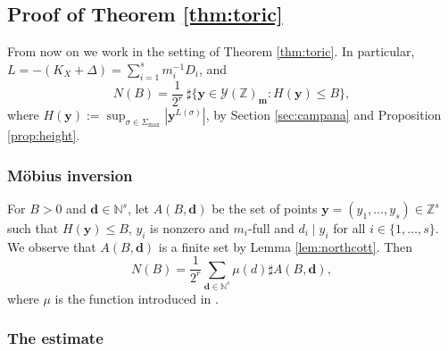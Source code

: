 \documentclass[11pt]{article}
\numberwithin{equation}{section}
\newcommand{\bfy}{\boldsymbol{y}}
\newcommand{\bfm}{{\boldsymbol{m}}}
\newcommand{\bfd}{\boldsymbol{d}}
\newcommand\ZZ{\mathbb{Z}}
\newcommand\NN{\mathbb{N}}
\theoremstyle{definition}
\numberwithin{theorem}{section}
\begin{document}
\subsection{Proof of Theorem \ref{thm:toric}}
\label{sec:proof_thmtoric}

From now on we work in the setting of Theorem \ref{thm:toric}.
In particular, $L=-(K_X+\Delta)=\sum_{i=1}^s m_i^{-1}D_i$, and
\[
N(B)=\frac 1{2^r}\ \sharp
\{\bfy\in\mathscr{Y}(\ZZ)_{\bfm}: H(\bfy)\leq B\},
\]
where
$H(\bfy):=\sup_{\sigma\in\Sigma_{\max}} | \bfy^{L(\sigma)}|$,
by Section \ref{sec:campana} and Proposition \ref{prop:height}.

\subsubsection{Möbius inversion}

For $B>0$ and $\bfd\in\NN^{s}$,
let $A(B,\bfd)$ be the set of points
$\bfy=(y_1,\dots,y_s)\in\ZZ^{s}$ such that
$H(\bfy)\leq B$, $y_i$ is nonzero and $m_i$-full and $d_i\mid y_i$ for all $i\in\{1,\dots,s\}$.
We observe that $A(B, \bfd)$ is a finite set by Lemma \ref{lem:northcott}.
Then
\begin{equation}
\label{eq:moebius_inversion}
N(B)=\frac 1{2^r}\sum_{\bfd\in\NN^{s}}\mu(d)\sharp A(B, \bfd),
\end{equation}
where $\mu$ is the function introduced in \cite[Def.\,\& Prop.\,11.9]{MR1679841}.

\subsubsection{The estimate}
\end{document}
